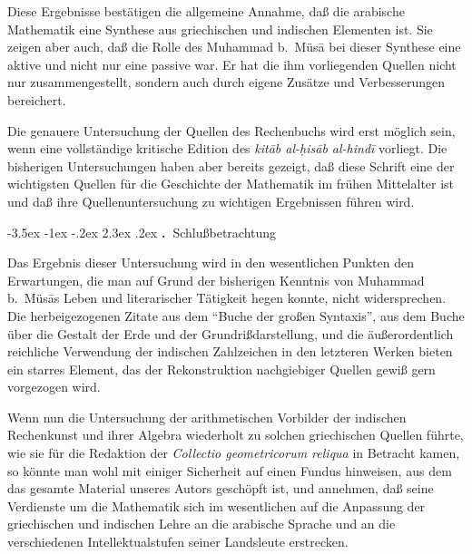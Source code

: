 \documentclass[11pt,a4paper]{article}
\makeatletter
\renewcommand{\section}{\@startsection{section}{1}{\z@}%
  {-3.5ex \@plus -1ex \@minus -.2ex}%
  {2.3ex \@plus .2ex}%
  {\normalfont\Large\bfseries\color{sectioncolor}\thesection.\ }}
\newcommand{\enquote}[1]{``#1''}
\makeatother
\begin{document}
Diese Ergebnisse best\"atigen die allgemeine Annahme, da\ss{} die arabische Mathematik eine Synthese aus griechischen und indischen Elementen ist. Sie zeigen aber auch, da\ss{} die Rolle des Muhammad b.\ M\"us\=a bei dieser Synthese eine aktive und nicht nur eine passive war. Er hat die ihm vorliegenden Quellen nicht nur zusammengestellt, sondern auch durch eigene Zus\"atze und Verbesserungen bereichert.

Die genauere Untersuchung der Quellen des Rechenbuchs wird erst m\"oglich sein, wenn eine vollst\"andige kritische Edition des \textit{kit\=ab al-\d{h}is\=ab al-hind\=i} vorliegt. Die bisherigen Untersuchungen haben aber bereits gezeigt, da\ss{} diese Schrift eine der wichtigsten Quellen f\"ur die Geschichte der Mathematik im fr\"uhen Mittelalter ist und da\ss{} ihre Quellenuntersuchung zu wichtigen Ergebnissen f\"uhren wird.

\clearpage

\section{Schlu\ss{}betrachtung}

Das Ergebnis dieser Untersuchung wird in den wesentlichen Punkten den Erwartungen, die man auf Grund der bisherigen Kenntnis von Muhammad b.\ M\"us\=as Leben und literarischer T\"atigkeit hegen konnte, nicht widersprechen. Die herbeigezogenen Zitate aus dem \enquote{Buche der gro\ss{}en Syntaxis}, aus dem Buche \"uber die Gestalt der Erde und der Grundri\ss{}darstellung, und die \"au\ss{}erordentlich reichliche Verwendung der indischen Zahlzeichen in den letzteren Werken bieten ein starres Element, das der Rekonstruktion nachgiebiger Quellen gewi\ss{} gern vorgezogen wird.

Wenn nun die Untersuchung der arithmetischen Vorbilder der indischen Rechenkunst und ihrer Algebra wiederholt zu solchen griechischen Quellen f\"uhrte, wie sie f\"ur die Redaktion der \textit{Collectio geometricorum reliqua} in Betracht kamen, so k\"onnte man wohl mit einiger Sicherheit auf einen Fundus hinweisen, aus dem das gesamte Material unseres Autors gesch\"opft ist, und annehmen, da\ss{} seine Verdienste um die Mathematik sich im wesentlichen auf die Anpassung der griechischen und indischen Lehre an die arabische Sprache und an die verschiedenen Intellektualstufen seiner Landsleute erstrecken.
\end{document}
